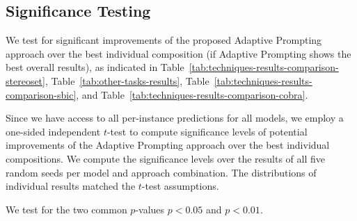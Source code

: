 \subsection{Significance Testing}
We test for significant improvements of the proposed Adaptive Prompting approach over the best individual composition (if Adaptive Prompting shows the best overall results), as indicated in Table~\ref{tab:techniques-results-comparison-stereoset}, Table~\ref{tab:other-tasks-results}, Table~\ref{tab:techniques-results-comparison-sbic}, and Table~\ref{tab:techniques-results-comparison-cobra}.

Since we have access to all per-instance predictions for all models, we employ a one-sided independent $t$-test to compute significance levels of potential improvements of the Adaptive Prompting approach over the best individual compositions. We compute the significance levels over the results of all five random seeds per model and approach combination. The distributions of individual results matched the $t$-test assumptions.

We test for the two common $p$-values $p<0.05$ and $p<0.01$.
